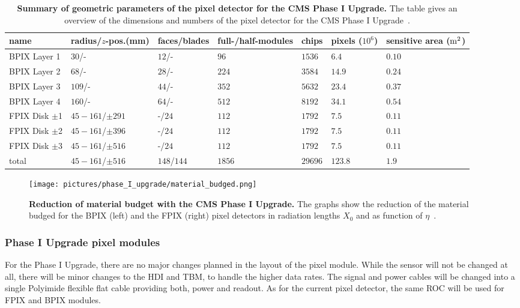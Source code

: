 \begin{table}
\caption[Summary of geometric parameters of the pixel detector for the CMS Phase I Upgrade]{\textbf{Summary of geometric parameters of the pixel detector for the \ac{CMS} Phase I Upgrade.} The table gives an overview of the dimensions and numbers of the pixel detector for the \ac{CMS} Phase I Upgrade~\cite{Dom12}.}\label{tab:pixel_detector_new}
\begin{center}
\begin{tabular}{@{}p{24mm}p{24mm}p{12mm}p{16mm}p{8.5mm}p{8.5mm}p{22mm}}
\toprule
name&radius/$z$-pos.\newline (mm)&faces/\newline blades&full-/half-modules&chips&pixels ($10^6$)&sensitive area ($\rm{m^2}$)\\
\midrule
\acs{BPIX} Layer 1&$30$/-&$12$/-&$96$&$1536$&$6.4$&$0.10$\\
\acs{BPIX} Layer 2&$68$/-&$28$/-&$224$&$3584$&$14.9$&$0.24$\\
\acs{BPIX} Layer 3&$109$/-&$44$/-&$352$&$5632$&$23.4$&$0.37$\\
\acs{BPIX} Layer 4&$160$/-&$64$/-&$512$&$8192$&$34.1$&$0.54$\\
\acs{FPIX} Disk $\pm$1&$45-161$/$\pm 291$&-/$24$&$112$&$1792$&$7.5$&$0.11$\\
\acs{FPIX} Disk $\pm$2&$45-161$/$\pm 396$&-/$24$&$112$&$1792$&$7.5$&$0.11$\\
\acs{FPIX} Disk $\pm$3&$45-161$/$\pm 516$&-/$24$&$112$&$1792$&$7.5$&$0.11$\\
\midrule
total &$45-161$/$\pm 516$&$148$/$144$&$1856$ &$29696$&$123.8$&$1.9$\\
\bottomrule
\end{tabular}
\end{center}
\end{table}
\begin{figure}
\begin{center}
\texttt{[image: pictures/phase\_I\_upgrade/material\_budged.png]}
\end{center}
\caption[Reduction of material budget with the CMS Phase I Upgrade]{\textbf{Reduction of material budget with the \ac{CMS} Phase I Upgrade.} The graphs show the reduction of the material budged for the \acs{BPIX} (left) and the \acs{FPIX} (right) pixel detectors in radiation lengths $X_0$ and as function of $\eta$~\cite{Fav11}.}\label{fig:material_budged}
\end{figure}


\subsubsection{Phase I Upgrade pixel modules}
For the Phase I Upgrade, there are no major changes planned in the layout of the pixel module. While the sensor will not be changed at all, there will be minor changes to the \ac{HDI} and \ac{TBM}, to handle the higher data rates. The signal and power cables will be changed into a single Polyimide flexible flat cable providing both, power and readout. As for the current pixel detector, the same \ac{ROC} will be used for \acs{FPIX} and \acs{BPIX} modules.

